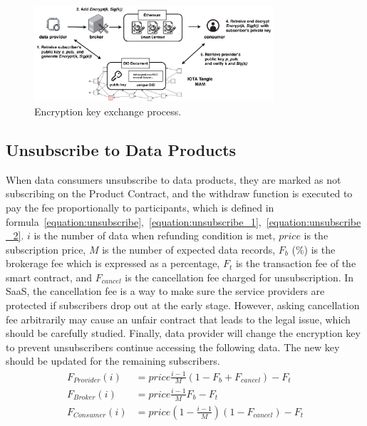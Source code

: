 \documentclass[10pt, conference, compsocconf]{IEEEtran}
\begin{document}
\begin{figure}[!t]
    \centering
    \includegraphics[width=3.5in]{key_exchange_reorganize}
    \caption{Encryption key exchange process.}
    \label{fig:key_exchange}
\end{figure}

\subsection{Unsubscribe to Data Products}
When data consumers unsubscribe to data products, they are marked as not subscribing on the Product Contract, and the withdraw function is executed to pay the fee proportionally to participants, which is defined in formula~\ref{equation:unsubscribe},~\ref{equation:unsubscribe_1},~\ref{equation:unsubscribe_2}. $i$ is the number of data when refunding condition is met, $price$  is the subscription price, $M$ is the number of expected data records, $F_{b}$ (\%) is the brokerage fee which is expressed as a percentage, $F_{t}$ is the transaction fee of the smart contract, and $F_{cancel}$ is the cancellation fee charged for unsubscription. In SaaS, the cancellation fee is a way to make sure the service providers are protected if subscribers drop out at the early stage. However, asking cancellation fee arbitrarily may cause an unfair contract that leads to the legal issue, which should be carefully studied. Finally, data provider will change the encryption key to prevent unsubscribers continue accessing the following data. The new key should be updated for the remaining subscribers.
\begin{align}
    F_{Provider}(i) &= price \frac{i-1}{M} (1-F_{b}+F_{cancel}) -F_{t} \label{equation:unsubscribe} \\
    F_{Broker}(i) &= price \frac{i-1}{M} F_{b} -F_{t} \label{equation:unsubscribe_1} \\
    F_{Consumer}(i) &= price (1-\frac{i-1}{M})(1 -F_{cancel}) -F_{t} \label{equation:unsubscribe_2}
\end{align}
\end{document}
